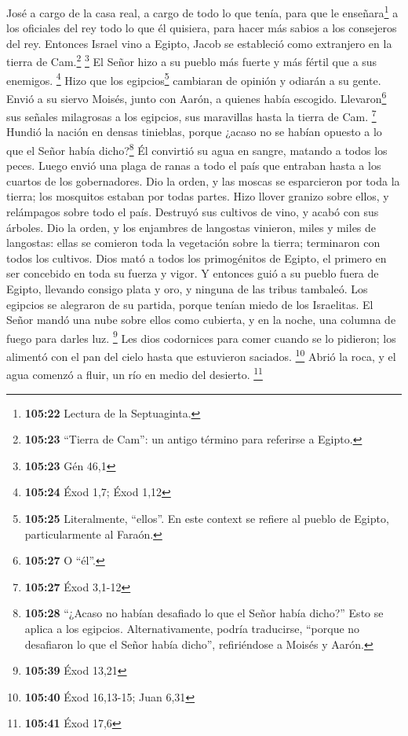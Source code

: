 José a cargo de la casa real, a cargo de todo lo que tenía,
 para que le enseñara\footnote{\textbf{105:22} Lectura de
  la Septuaginta.} a los oficiales del rey todo lo que él quisiera, para
hacer más sabios a los consejeros del rey.  Entonces
Israel vino a Egipto, Jacob se estableció como extranjero en la tierra
de Cam.\footnote{\textbf{105:23} ``Tierra de Cam'': un antigo término
  para referirse a Egipto.} \footnote{\textbf{105:23} Gén 46,1}
 El Señor hizo a su pueblo más fuerte y más fértil que a
sus enemigos. \footnote{\textbf{105:24} Éxod 1,7; Éxod 1,12}
 Hizo que los egipcios\footnote{\textbf{105:25}
  Literalmente, ``ellos''. En este context se refiere al pueblo de
  Egipto, particularmente al Faraón.} cambiaran de opinión y odiarán a
su gente.  Envió a su siervo Moisés, junto con Aarón, a
quienes había escogido.  Llevaron\footnote{\textbf{105:27}
  O ``él''.} sus señales milagrosas a los egipcios, sus maravillas hasta
la tierra de Cam. \footnote{\textbf{105:27} Éxod 3,1-12} 
Hundió la nación en densas tinieblas, porque ¿acaso no se habían opuesto
a lo que el Señor había dicho?\footnote{\textbf{105:28} ``¿Acaso no
  habían desafiado lo que el Señor había dicho?'' Esto se aplica a los
  egipcios. Alternativamente, podría traducirse, ``porque no desafiaron
  lo que el Señor había dicho'', refiriéndose a Moisés y Aarón.}
 Él convirtió su agua en sangre, matando a todos los
peces.  Luego envió una plaga de ranas a todo el país que
entraban hasta a los cuartos de los gobernadores.  Dio la
orden, y las moscas se esparcieron por toda la tierra; los mosquitos
estaban por todas partes.  Hizo llover granizo sobre
ellos, y relámpagos sobre todo el país.  Destruyó sus
cultivos de vino, y acabó con sus árboles.  Dio la orden,
y los enjambres de langostas vinieron, miles y miles de langostas:
 ellas se comieron toda la vegetación sobre la tierra;
terminaron con todos los cultivos.  Dios mató a todos los
primogénitos de Egipto, el primero en ser concebido en toda su fuerza y
vigor.  Y entonces guió a su pueblo fuera de Egipto,
llevando consigo plata y oro, y ninguna de las tribus tambaleó.
 Los egipcios se alegraron de su partida, porque tenían
miedo de los Israelitas.  El Señor mandó una nube sobre
ellos como cubierta, y en la noche, una columna de fuego para darles
luz. \footnote{\textbf{105:39} Éxod 13,21}  Les dios
codornices para comer cuando se lo pidieron; los alimentó con el pan del
cielo hasta que estuvieron saciados. \footnote{\textbf{105:40} Éxod
  16,13-15; Juan 6,31}  Abrió la roca, y el agua comenzó
a fluir, un río en medio del desierto. \footnote{\textbf{105:41} Éxod
  17,6}

